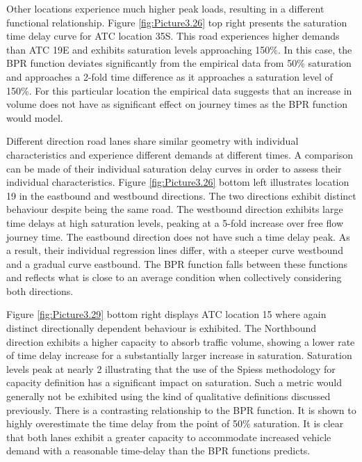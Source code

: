 \documentclass{CUP-JNL-DCE}
\begin{document}
Other locations experience much higher peak loads, resulting in a different functional relationship. Figure \ref{fig:Picture3.26} top right presents the saturation time delay curve for ATC location 35S. This road experiences higher demands than ATC 19E and exhibits saturation levels approaching 150\%. In this case, the BPR function deviates significantly from the empirical data from 50\% saturation and approaches a 2-fold time difference as it approaches a saturation level of 150\%. For this particular location the empirical data suggests that an increase in volume does not have as significant effect on journey times as the BPR function would model.

Different direction road lanes share similar geometry with individual characteristics and experience different demands at different times. A comparison can be made of their individual saturation delay curves in order to assess their individual characteristics. Figure \ref{fig:Picture3.26} bottom left illustrates location 19 in the eastbound and westbound directions. The two directions exhibit distinct behaviour despite being the same road. The westbound direction exhibits large time delays at high saturation levels, peaking at a 5-fold increase over free flow journey time.  The eastbound direction does not have such a time delay peak. As a result, their individual regression lines differ, with a steeper curve westbound and a gradual curve eastbound. The BPR function falls between these functions and reflects what is close to an average condition when collectively considering both directions. 

Figure \ref{fig:Picture3.29} bottom right displays ATC location 15 where again distinct directionally dependent behaviour is exhibited. The Northbound direction exhibits a higher capacity to absorb traffic volume, showing a lower rate of time delay increase for a substantially larger increase in saturation. Saturation levels peak at nearly 2 illustrating that the use of the Spiess \citep{spiess1990technical} methodology for capacity definition has a significant impact on saturation. Such a metric would generally not be exhibited using the kind of qualitative definitions discussed previously. There is a contrasting relationship to the BPR function. It is shown to highly overestimate the time delay from the point of 50\% saturation. It is clear that both lanes exhibit a greater capacity to accommodate increased vehicle demand with a reasonable time-delay than the BPR functions predicts.
\end{document}
